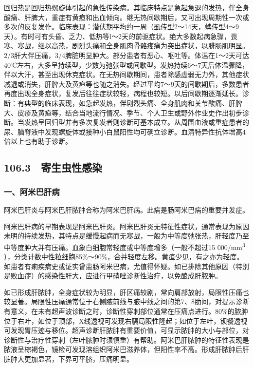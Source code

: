 回归热是回归热螺旋体引起的急性传染病。其临床特点是急起急退的发热，伴全身酸痛、肝脾大，重症有黄疸和出血倾向。继无热间歇期后，又可出现周期性一次或多次的反复发作。临床表现：潜伏期平均约一周（虱传型2～14天，蜱传型4～9天）。有时可有头昏、乏力、低热等l～2天的前驱症状。绝大多数起病急骤，畏寒、寒战，继以高热，剧烈头痛和全身肌肉骨骼疼痛为突出症状，以腓肠肌明显。2/3肝大伴压痛，3/4脾脏明显肿大。部分患者有恶心、呕吐等。体温在1～2天可达40℃左右，大多呈持续型，少数为弛张型或间歇型。发热持续6～7天后体温骤降，伴以大汗，甚至出现休克症状。在无热间歇期间，患者除感虚弱无力外，其他症状减退或消失，肝脾大及黄疸等也随之消失。经过平均7～9天的间歇期后，多数患者再度出现全身症状，复发后往往症状较轻，病程也较短。以后间歇期逐渐延长。诊断：有典型的临床表现，如急起发热，伴剧烈头痛、全身肌肉和关节酸痛、肝脾大、皮疹及黄疸等，结合当地流行情况、季节、个人卫生或野外作业史作出初步诊断。当发热呈回归型并有多次复发者则诊断可基本成立。从周围血液或重症患者的尿、脑脊液中发现螺旋体或接种小白鼠阳性均可确立诊断。血清特异性抗体增高4倍以上也有助于诊断。

\protect\hypertarget{text00241.html}{}{}

\subsection{106.3　寄生虫性感染}

\subsubsection{一、阿米巴肝病}

阿米巴肝炎与阿米巴肝脓肿合称为阿米巴肝病。此病是肠阿米巴病的重要并发症。

阿米巴肝病的早期表现是阿米巴肝炎。阿米巴肝炎无特征性症状，通常表现为原因未明的持续发热，其特点是缓慢起病而无寒战，一般为中等度弛张热，肝轻度乃至中等度肿大并有压痛。血象白细胞常轻度或中等度增多（一般不超过15
000/mm\textsuperscript{3}
），分类计数中性粒细胞85\%～90\%，合并轻度左移。黄疸少见，有之亦为轻度。如患者有痢疾病史或证实曾患肠阿米巴病，尤值得怀疑。如已排除其他原因（特别是败血症）的感染性肝大，应进行甲硝唑诊断性治疗，以免酿成肝脓肿。

如已形成肝脓肿，全身症状较为明显，肝区痛较剧，常向肩部放射，局限性压痛也较显著。局限性压痛通常位于右侧腋前线与腋中线之间的第7、8肋间，对提示诊断有意义，在未有超声波诊断之时，诊断性穿刺部位通常在压痛点进行。80\%的脓肿位于右叶，如位于顶部，X线透视可发现右膈局限性隆起；如位于左叶，钡餐透视可发现胃压迹与移位。超声诊断肝脓肿有重要价值，可显示脓肿的大小与部位，对诊断性与治疗性穿刺（左叶脓肿时须慎重）有帮助。阿米巴肝脓肿的特征性表现是脓液呈棕褐色，镜检可发现溶组织阿米巴滋养体，但阳性率不高。形成肝脓肿后肝脏肿大更加显著，下界可平脐，压痛明显。

